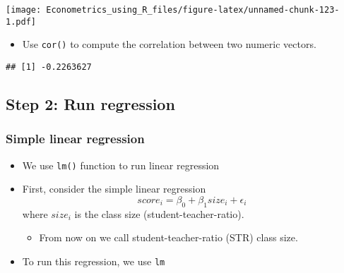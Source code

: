 \documentclass[]{book}
\newenvironment{Shaded}{\begin{snugshade}}{\end{snugshade}}
\newcommand{\KeywordTok}[1]{\textcolor[rgb]{0.13,0.29,0.53}{\textbf{#1}}}
\newcommand{\DataTypeTok}[1]{\textcolor[rgb]{0.13,0.29,0.53}{#1}}
\newcommand{\StringTok}[1]{\textcolor[rgb]{0.31,0.60,0.02}{#1}}
\newcommand{\CommentTok}[1]{\textcolor[rgb]{0.56,0.35,0.01}{\textit{#1}}}
\newcommand{\OperatorTok}[1]{\textcolor[rgb]{0.81,0.36,0.00}{\textbf{#1}}}
\newcommand{\NormalTok}[1]{#1}
\providecommand{\tightlist}{%
  \setlength{\itemsep}{0pt}\setlength{\parskip}{0pt}}
\begin{document}
\texttt{[image: Econometrics\_using\_R\_files/figure-latex/unnamed-chunk-123-1.pdf]}

\begin{itemize}
\tightlist
\item
  Use \texttt{cor()} to compute the correlation between two numeric
  vectors.
\end{itemize}

\begin{Shaded}
\end{Shaded}

\begin{verbatim}
## [1] -0.2263627
\end{verbatim}

\subsection{Step 2: Run regression}\label{step-2-run-regression}

\subsubsection{Simple linear regression}\label{simple-linear-regression}

\begin{itemize}
\tightlist
\item
  We use \texttt{lm()} function to run linear regression
\item
  First, consider the simple linear regression \[
  score_i = \beta_0 + \beta_1 size_i + \epsilon_i
  \] where \(size_i\) is the class size (student-teacher-ratio).

  \begin{itemize}
  \tightlist
  \item
    From now on we call student-teacher-ratio (STR) class size.
  \end{itemize}
\item
  To run this regression, we use \texttt{lm}
\end{itemize}

\begin{Shaded}
\end{Shaded}
\end{document}

